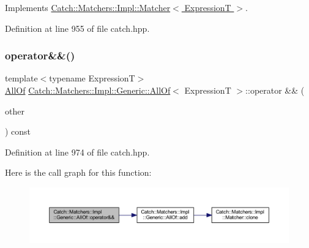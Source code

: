 Implements \hyperlink{struct_catch_1_1_matchers_1_1_impl_1_1_matcher_a8c1c5511ce1f3738a45e6901b558f583}{Catch\+::\+Matchers\+::\+Impl\+::\+Matcher$<$ Expression\+T $>$}.



Definition at line 955 of file catch.\+hpp.

\hypertarget{class_catch_1_1_matchers_1_1_impl_1_1_generic_1_1_all_of_aca6497aaa7fdb6560ebe850f32ccbf15}{}\label{class_catch_1_1_matchers_1_1_impl_1_1_generic_1_1_all_of_aca6497aaa7fdb6560ebe850f32ccbf15} 
\subsubsection{\texorpdfstring{operator\&\&()}{operator\&\&()}}
{\footnotesize\ttfamily template$<$typename ExpressionT$>$ \\
\hyperlink{class_catch_1_1_matchers_1_1_impl_1_1_generic_1_1_all_of}{All\+Of} \hyperlink{class_catch_1_1_matchers_1_1_impl_1_1_generic_1_1_all_of}{Catch\+::\+Matchers\+::\+Impl\+::\+Generic\+::\+All\+Of}$<$ ExpressionT $>$\+::operator \&\& (\begin{DoxyParamCaption}\item[{\hyperlink{struct_catch_1_1_matchers_1_1_impl_1_1_matcher}{Matcher}$<$ ExpressionT $>$ const \&}]{other }\end{DoxyParamCaption}) const\hspace{0.3cm}{\ttfamily [inline]}}



Definition at line 974 of file catch.\+hpp.

Here is the call graph for this function\+:\nopagebreak
\begin{figure}[H]
\begin{center}
\leavevmode
\includegraphics[width=350pt]{class_catch_1_1_matchers_1_1_impl_1_1_generic_1_1_all_of_aca6497aaa7fdb6560ebe850f32ccbf15_cgraph}
\end{center}
\end{figure}
\hypertarget{class_catch_1_1_matchers_1_1_impl_1_1_generic_1_1_all_of_a8c8e7742501dc81e51a3c745d6f74119}{}\label{class_catch_1_1_matchers_1_1_impl_1_1_generic_1_1_all_of_a8c8e7742501dc81e51a3c745d6f74119} 

